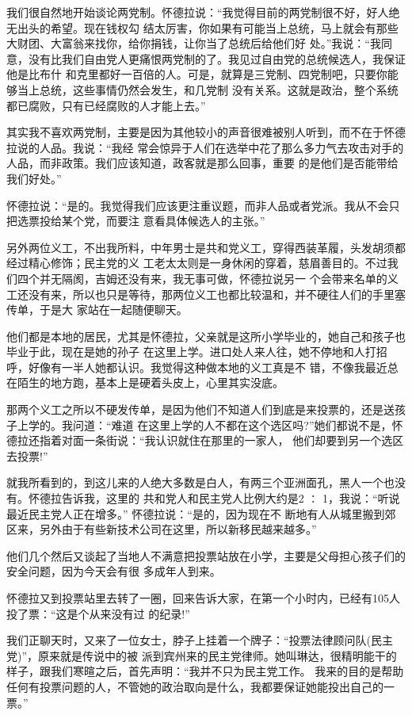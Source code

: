 ﻿\documentclass[11pt]{article}
\begin{document}
我们很自然地开始谈论两党制。怀德拉说：``我觉得目前的两党制很不好，好人绝无出头的希望。现在钱权勾
结太厉害，你如果有可能当上总统，马上就会有那些大财团、大富翁来找你，给你捐钱，让你当了总统后给他们好
处。''我说：``我同意，没有比我们自由党人更痛恨两党制的了。我见过自由党的总统候选人，我保证他是比布什
和克里都好一百倍的人。可是，就算是三党制、四党制吧，只要你能够当上总统，这些事情仍然会发生，和几党制
没有关系。这就是政治，整个系统都已腐败，只有已经腐败的人才能上去。''

其实我不喜欢两党制，主要是因为其他较小的声音很难被别人听到，而不在于怀德拉说的人品。我说：``我经
常会惊异于人们在选举中花了那么多力气去攻击对手的人品，而非政策。我们应该知道，政客就是那么回事，重要
的是他们是否能带给我们好处。''

怀德拉说：``是的。我觉得我们应该更注重议题，而非人品或者党派。我从不会只把选票投给某个党，而要注
意看具体候选人的主张。''

另外两位义工，不出我所料，中年男士是共和党义工，穿得西装革履，头发胡须都经过精心修饰；民主党的义
工老太太则是一身休闲的穿着，慈眉善目的。不过我们四个并无隔阂，吉姆还没有来，我无事可做，怀德拉说另一
个会带来名单的义工还没有来，所以也只是等待，那两位义工也都比较温和，并不硬往人们的手里塞传单，于是大
家站在一起随便聊天。

他们都是本地的居民，尤其是怀德拉，父亲就是这所小学毕业的，她自己和孩子也毕业于此，现在是她的孙子
在这里上学。进口处人来人往，她不停地和人打招呼，好像有一半人她都认识。我觉得这种做本地的义工真是不
错，不像我最近总在陌生的地方跑，基本上是硬着头皮上，心里其实没底。

那两个义工之所以不硬发传单，是因为他们不知道人们到底是来投票的，还是送孩子上学的。我问道：``难道
在这里上学的人不都在这个选区吗?''她们都说不是，怀德拉还指着对面一条街说：``我认识就住在那里的一家人，
他们却要到另一个选区去投票!''

就我所看到的，到这儿来的人绝大多数是白人，有两三个亚洲面孔，黑人一个也没有。怀德拉告诉我，这里的
共和党人和民主党人比例大约是2 ∶ 1，我说：``听说最近民主党人正在增多。'' 怀德拉说：``是的，因为现在不
断地有人从城里搬到郊区来，另外由于有些新技术公司在这里，所以新移民越来越多。''

他们几个然后又谈起了当地人不满意把投票站放在小学，主要是父母担心孩子们的安全问题，因为今天会有很
多成年人到来。

怀德拉又到投票站里去转了一圈，回来告诉大家，在第一个小时内，已经有105人投了票：``这是个从来没有过
的纪录!''

我们正聊天时，又来了一位女士，脖子上挂着一个牌子：``投票法律顾问队(民主党)''，原来就是传说中的被
派到宾州来的民主党律师。她叫琳达，很精明能干的样子，跟我们寒暄之后，首先声明：``我并不只为民主党工作。
我来的目的是帮助任何有投票问题的人，不管她的政治取向是什么，我都要保证她能投出自己的一票。''
\end{document}
